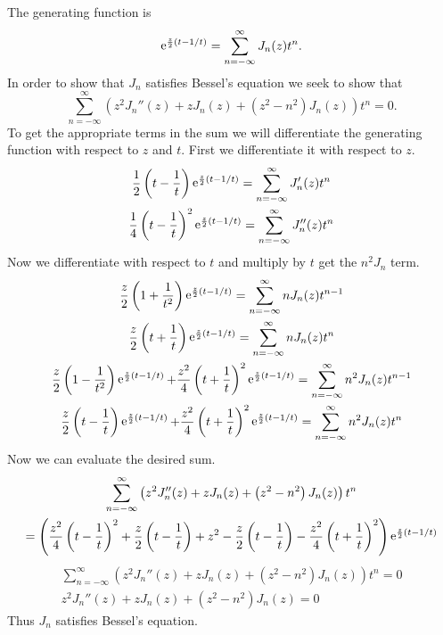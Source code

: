 {%
\begin{Solution}
  The generating function is
  \[
  \mathop{\mathrm{e}}\nolimits^{ \frac{z}{2} (t - 1/t) } = \sum_{n = -\infty}^\infty J_n(z) t^n.
  \]
  In order to show that $J_n$ satisfies Bessel's equation we seek to show that 
  \[
  \sum_{n = -\infty}^\infty \left( z^2 J_n''(z) + z J_n(z) + (z^2 - n^2) J_n(z) \right) t^n = 0.
  \]
  To get the appropriate terms in the sum we will differentiate the generating
  function with respect to $z$ and $t$.  First we differentiate it with 
  respect to $z$.
  \begin{gather*}
    \frac{1}{2} \left( t - \frac{1}{t} \right) \mathop{\mathrm{e}}\nolimits^{ \frac{z}{2} (t - 1/t) } 
    = \sum_{n = -\infty}^\infty J_n'(z) t^n 
    \\
    \frac{1}{4} \left( t - \frac{1}{t} \right)^2 \mathop{\mathrm{e}}\nolimits^{ \frac{z}{2} (t - 1/t) } 
    = \sum_{n = -\infty}^\infty J_n''(z) t^n
  \end{gather*}
  Now we differentiate with respect to $t$ and multiply by $t$
  get the $n^2 J_n$ term.
  \begin{gather*}
    \frac{z}{2} \left( 1 + \frac{1}{t^2} \right) \mathop{\mathrm{e}}\nolimits^{ \frac{z}{2} (t - 1/t) } 
    = \sum_{n = -\infty}^\infty n J_n(z) t^{n-1} 
    \\
    \frac{z}{2} \left( t + \frac{1}{t} \right) \mathop{\mathrm{e}}\nolimits^{ \frac{z}{2} (t - 1/t) } 
    = \sum_{n = -\infty}^\infty n J_n(z) t^n 
    \\
    \frac{z}{2} \left( 1 - \frac{1}{t^2} \right) \mathop{\mathrm{e}}\nolimits^{ \frac{z}{2} (t - 1/t) } 
    + \frac{z^2}{4} \left( t + \frac{1}{t} \right)^2 \mathop{\mathrm{e}}\nolimits^{ \frac{z}{2} (t - 1/t) } 
    = \sum_{n = -\infty}^\infty n^2 J_n(z) t^{n-1} 
    \\
    \frac{z}{2} \left( t - \frac{1}{t} \right) \mathop{\mathrm{e}}\nolimits^{ \frac{z}{2} (t - 1/t) } 
    + \frac{z^2}{4} \left( t + \frac{1}{t} \right)^2 \mathop{\mathrm{e}}\nolimits^{ \frac{z}{2} (t - 1/t) } 
    = \sum_{n = -\infty}^\infty n^2 J_n(z) t^n 
  \end{gather*}
  Now we can evaluate the desired sum.
  \begin{multline*}
    \sum_{n = -\infty}^\infty \left( z^2 J_n''(z) + z J_n(z) 
      + \left( z^2 - n^2 \right) J_n(z) \right) t^n 
    \\
    = \left( 
      \frac{z^2}{4} \left( t - \frac{1}{t} \right)^2 
      + \frac{z}{2} \left( t - \frac{1}{t} \right) 
      + z^2
      - \frac{z}{2} \left( t - \frac{1}{t} \right)
      - \frac{z^2}{4} \left( t + \frac{1}{t} \right)^2
    \right)
    \mathop{\mathrm{e}}\nolimits^{ \frac{z}{2} (t - 1/t) } 
  \end{multline*}
  \begin{gather*}
    \sum_{n = -\infty}^\infty \left( z^2 J_n''(z) + z J_n(z) 
      + \left( z^2 - n^2 \right) J_n(z) \right) t^n 
    = 0 
    \\
    \boxed{
      z^2 J_n''(z) + z J_n(z) + \left( z^2 - n^2 \right) J_n(z) = 0
      }
  \end{gather*}
  Thus $J_n$ satisfies Bessel's equation.
\end{Solution}








}
